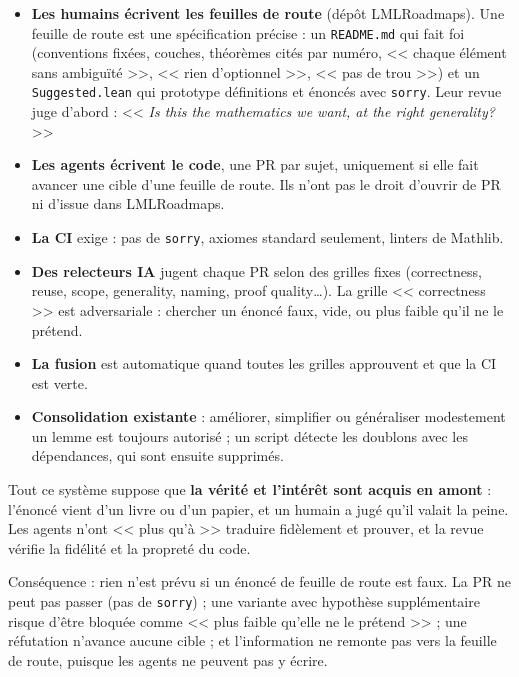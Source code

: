 \documentclass[11pt,a4paper]{article}
\begin{document}
\begin{itemize}
\item \textbf{Les humains écrivent les feuilles de route} (dépôt LMLRoadmaps). Une feuille de route est une
  spécification précise : un \texttt{README.md} qui fait foi (conventions fixées, couches,
  théorèmes cités par numéro, << chaque élément sans ambiguïté >>, << rien d'optionnel >>, << pas de trou >>)
  et un \texttt{Suggested.lean} qui prototype définitions et énoncés avec \texttt{sorry}.
  Leur revue juge d'abord : << \emph{Is this the mathematics we want, at the right generality?} >>
\item \textbf{Les agents écrivent le code}, une PR par sujet, uniquement si elle fait avancer une cible
  d'une feuille de route. Ils n'ont pas le droit d'ouvrir de PR ni d'issue dans LMLRoadmaps.
\item \textbf{La CI} exige : pas de \texttt{sorry}, axiomes standard seulement, linters de Mathlib.
\item \textbf{Des relecteurs IA} jugent chaque PR selon des grilles fixes (correctness, reuse, scope,
  generality, naming, proof quality\dots). La grille << correctness >> est adversariale : chercher un
  énoncé faux, vide, ou plus faible qu'il ne le prétend.
\item \textbf{La fusion} est automatique quand toutes les grilles approuvent et que la CI est verte.
\item \textbf{Consolidation existante} : améliorer, simplifier ou généraliser modestement un lemme est
  toujours autorisé ; un script détecte les doublons avec les dépendances, qui sont ensuite supprimés.
\end{itemize}

\begin{pourquoi}
Tout ce système suppose que \textbf{la vérité et l'intérêt sont acquis en amont} : l'énoncé vient d'un
livre ou d'un papier, et un humain a jugé qu'il valait la peine. Les agents n'ont << plus qu'à >>
traduire fidèlement et prouver, et la revue vérifie la fidélité et la propreté du code.

Conséquence : rien n'est prévu si un énoncé de feuille de route est faux. La PR ne peut pas passer
(pas de \texttt{sorry}) ; une variante avec hypothèse supplémentaire risque d'être bloquée comme
<< plus faible qu'elle ne le prétend >> ; une réfutation n'avance aucune cible ; et l'information
ne remonte pas vers la feuille de route, puisque les agents ne peuvent pas y écrire.
\end{pourquoi}
\end{document}

